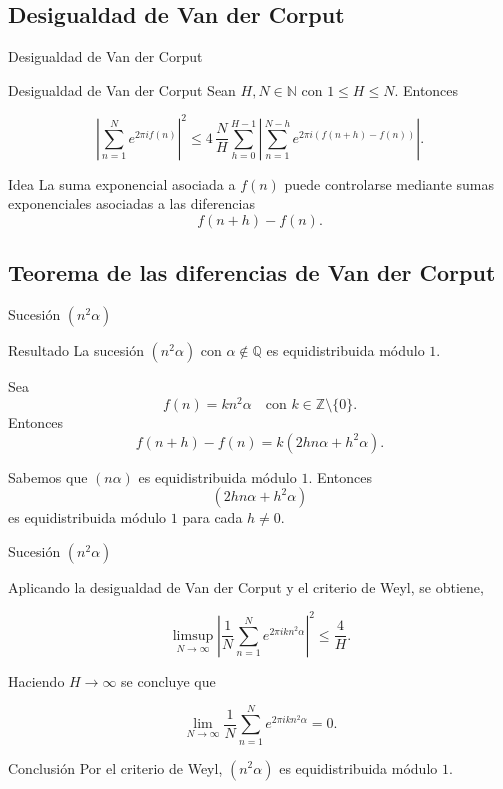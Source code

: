 \subsection{Desigualdad de Van der Corput}
\begin{frame}{Desigualdad de Van der Corput}

\begin{block}{Desigualdad de Van der Corput}
Sean $H,N\in\mathbb N$ con $1\le H\le N$. Entonces

\[
\left|\sum_{n=1}^{N} e^{2\pi i f(n)} \right|^2
\le
4 \, \frac{N}{H} \sum_{h=0}^{H-1} \left|\sum_{n=1}^{N-h}e^{2\pi i(f(n+h)-f(n))}\right|.
\]
\end{block}

\vspace{0.2cm}
\pause

\begin{exampleblock}{Idea}
La suma exponencial asociada a $f(n)$ puede controlarse
mediante sumas exponenciales asociadas a las diferencias
\[
f(n+h)-f(n).
\]
\end{exampleblock}

\end{frame}


\subsection{Teorema de las diferencias de Van der Corput}
\begin{frame}{Sucesión $(n^2\alpha)$}

\begin{block}{Resultado}
La sucesión $(n^2\alpha)$ con $\alpha\notin\mathbb Q$ es equidistribuida módulo $1$.
\end{block}

\pause 

Sea
\[
f(n)=kn^2\alpha \quad \text{con } k \in \mathbb{Z} \setminus \{0\}.
\]
Entonces
\[
f(n+h)-f(n)=k(2hn\alpha+h^2\alpha).
\]

\pause

Sabemos que $(n\alpha)$ es equidistribuida módulo $1$. 
Entonces 
\[
(2hn\alpha+h^2\alpha)
\] 
es equidistribuida módulo $1$ para cada $h \neq 0$.

\end{frame}

\begin{frame}{Sucesión $(n^2\alpha)$}

Aplicando la desigualdad de Van der Corput y el criterio
de Weyl, se obtiene,

\[
\limsup_{N\to\infty}
\left|
\frac1N
\sum_{n=1}^{N}
e^{2\pi ikn^2\alpha}
\right|^2
\le
\frac4H.
\]

\vspace{0.3cm}
\pause

Haciendo $H\to\infty$ se concluye que

\[
\lim_{N\to\infty}
\frac1N
\sum_{n=1}^{N}
e^{2\pi ikn^2\alpha}
=0.
\]

\begin{block}{Conclusión}
Por el criterio de Weyl, $(n^2\alpha)$ es equidistribuida módulo $1$.
\end{block}

\end{frame}


